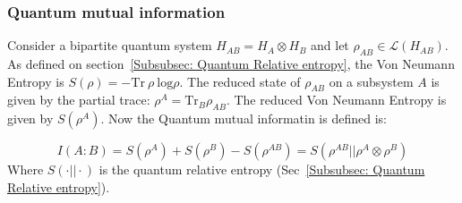 \subsubsection{Quantum mutual information}
\label{Subsubsec: Quantum mutual information}

Consider a bipartite quantum system $H_{AB} = H_A \otimes H_B$ and let $\rho_{AB} \in \mathcal{L}(H_{AB})$. As defined on section~\ref{Subsubsec: Quantum Relative entropy}, the Von Neumann Entropy is $S(\rho) = - \mathrm{Tr} \ \rho \ \mathrm{log}\rho$. The reduced state of $\rho_{AB}$ on a subsystem $A$ is given by the partial trace: $\rho^A = \mathrm{Tr}_B \rho_{AB}$. The reduced Von Neumann Entropy is given by $S(\rho^A)$. Now the Quantum mutual informatin is defined is:

\begin{equation}
    I(A:B) = S(\rho^A) + S(\rho^B) - S(\rho^{AB}) = S(\rho^{AB} || \rho^A \otimes \rho^B)
\end{equation}
Where $S(\cdot || \cdot)$ is the quantum relative entropy (Sec~\ref{Subsubsec: Quantum Relative entropy}).